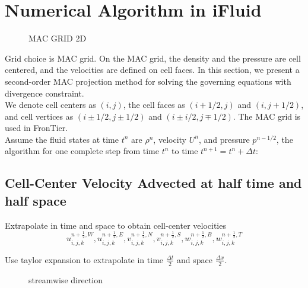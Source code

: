 \documentclass{article}
\numberwithin{equation}{subsection}
\begin{document}
\section{Numerical Algorithm in iFluid}
\begin{figure}[!htb]
\centering
{}
\caption{MAC GRID 2D}
\end{figure}
Grid choice is MAC grid. On the MAC grid, the density and the pressure are cell centered, and the velocities are defined on cell faces. In this section, we present a second-order MAC projection method for solving the governing equations with divergence constraint.\\
We denote cell centers as $(i,j)$, the cell faces as $(i+1/2,j)$ and $(i,j+1/2)$, and cell vertices as $(i \pm 1/2, j \pm 1/2)$ and $(i \pm i/2, j \mp 1/2)$. The MAC grid is used in FronTier. \\
Assume the fluid states at time $t^n$ are $\rho^n$, velocity $U^n$, and pressure $p^{n-1/2}$, the algorithm for one complete step from time $t^n$ to time $t^{n+1} = t^n + \Delta t$:



\subsection{Cell-Center Velocity Advected at half time and half space}
Extrapolate in time and space to obtain cell-center velocities
\begin{equation}
u_{i,j,k}^{n+\frac{1}{2}, W},
u_{i,j,k}^{n+\frac{1}{2}, E},
v_{i,j,k}^{n+\frac{1}{2}, N},
v_{i,j,k}^{n+\frac{1}{2}, S},
w_{i,j,k}^{n+\frac{1}{2}, B},
w_{i,j,k}^{n+\frac{1}{2}, T}
\end{equation}

Use taylor expansion to extrapolate in time $\frac{\Delta t}{2}$ and space $\frac{\Delta x}{2}$.
\begin{figure}[!htb]
\centering
{}
\caption{streamwise direction}
\end{figure}
\end{document}
